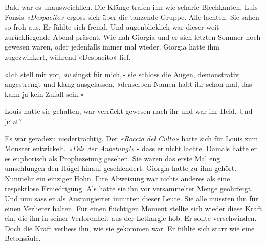 \sectionbreak


\sectionbreak

Bald war es unausweichlich. Die Klänge trafen ihn wie scharfe Blechkanten. Luis Fonsis \emph{«Despacito»} ergoss sich
über die tanzende Gruppe. Alle lachten. Sie sahen so froh aus. Er fühlte sich fremd. 
Und augenblicklich war dieser weit zurückliegende Abend präsent. Wie nah
Giorgia und er sich letzten Sommer noch gewesen waren, oder jedenfalls
immer mal wieder. Giorgia hatte ihm zugezwinkert, während «Despacito» lief.

«Ich stell mir vor, \emph{du} singst für mich,» sie schloss die Augen,
demonstrativ angestrengt und klang ausgelassen, «denselben Namen habt ihr
schon mal, das kann ja kein Zufall sein.»

Louis hatte sie gehalten, war verrückt gewesen nach ihr und war 
ihr Held. Und jetzt?


Es war geradezu niederträchtig. Der \emph{«Roccia del Culto»} hatte sich
für Louis zum Monster entwickelt. \emph{«Fels der Anbetung!»}  - dass er
nicht lachte. Damals hatte er es euphorisch als Prophezeiung gesehen.
Sie waren das erste Mal eng umschlungen den Hügel hinauf geschlendert.
Giorgia hatte zu ihm gehört. Nunmehr ein einziger Hohn.
Ihre Abweisung war nichts anderes als eine respektlose Erniedrigung. Als hätte sie ihn vor
versammelter Menge geohrfeigt. Und nun sass er als Ausrangierter inmitten dieser Leute.
Sie alle mussten ihn für einen Verlierer halten.
Für einen flüchtigen Moment stellte sich wieder diese Kraft ein, die ihn in seiner Verlorenheit 
aus der Lethargie hob. Er sollte verschwinden. Doch die Kraft verliess ihn, wie sie gekommen war.
Er fühlte sich starr wie eine Betonsäule.
